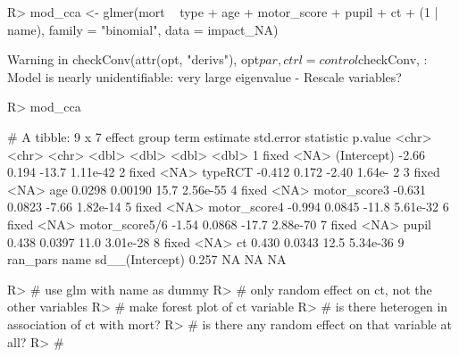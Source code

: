 \documentclass[
]{jss}
\begin{document}
\begin{CodeChunk}
\begin{CodeInput}
R> mod_cca <- glmer(mort ~ type + age + motor_score + pupil + ct + (1 | name), family = "binomial", data = impact_NA) 
\end{CodeInput}
\begin{CodeOutput}
Warning in checkConv(attr(opt, "derivs"), opt$par, ctrl = control$checkConv, : Model is nearly unidentifiable: very large eigenvalue
 - Rescale variables?
\end{CodeOutput}
\begin{CodeInput}
R> mod_cca %
\end{CodeInput}
\begin{CodeOutput}
# A tibble: 9 x 7
  effect   group term            estimate std.error statistic   p.value
  <chr>    <chr> <chr>              <dbl>     <dbl>     <dbl>     <dbl>
1 fixed    <NA>  (Intercept)      -2.66     0.194      -13.7   1.11e-42
2 fixed    <NA>  typeRCT          -0.412    0.172       -2.40  1.64e- 2
3 fixed    <NA>  age               0.0298   0.00190     15.7   2.56e-55
4 fixed    <NA>  motor_score3     -0.631    0.0823      -7.66  1.82e-14
5 fixed    <NA>  motor_score4     -0.994    0.0845     -11.8   5.61e-32
6 fixed    <NA>  motor_score5/6   -1.54     0.0868     -17.7   2.88e-70
7 fixed    <NA>  pupil             0.438    0.0397      11.0   3.01e-28
8 fixed    <NA>  ct                0.430    0.0343      12.5   5.34e-36
9 ran_pars name  sd__(Intercept)   0.257   NA           NA    NA       
\end{CodeOutput}
\begin{CodeInput}
R> # use glm with name as dummy
R> # only random effect on ct, not the other variables
R> # make forest plot of ct variable
R> # is there heterogen in association of ct with mort?
R> # is there any random effect on that variable at all?
R> # 
\end{CodeInput}
\end{CodeChunk}
\end{document}
